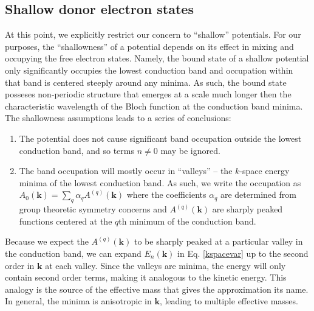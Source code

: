 \subsection{Shallow donor electron states}
At this point, we explicitly restrict our concern to ``shallow''
potentials. For our purposes, the ``shallowness'' of a potential
depends on its effect in mixing and occupying the free electron
states. Namely, the bound state of a shallow potential only significantly
occupies the lowest conduction band and occupation within that band is
centered steeply around any minima. As such, the bound state posseses
non-periodic structure that emerges at a scale much longer then the
characteristic wavelength of the Bloch function at the conduction band
minima. The shallowness assumptions leads to a series of conclusions:
\begin{enumerate}
\item The potential does not cause significant band occupation outside
  the lowest conduction band, and so terms $n \ne 0$ may be ignored.
\item The band occupation will mostly occur in ``valleys'' -- the
  $k$-space energy minima of the lowest conduction band. As such, we
  write the occupation as $A_0(\bm{k}) = \sum_{q} \alpha_{q}
  A^{(q)}(\bm{k})$ where the coefficients $\alpha_{q}$ are determined
  from group theoretic symmetry concerns and $A^{(q)}(\bm{k})$ are
  sharply peaked functions centered at the $q$th minimum of the
  conduction band.
\end{enumerate}

Because we expect the $A^{(q)}(\bm{k})$ to be sharply peaked at a
particular valley in the conduction band, we can expand $E_n(\bm{k})$
in Eq. \eqref{kspacevar} up to the second order in $\bm{k}$ at each
valley. Since the valleys are minima, the energy will only contain
second order terms, making it analogous to the kinetic energy. This
analogy is the source of the effective mass that gives the
approximation its name. In general, the minima is anisotropic in
$\bm{k}$, leading to multiple effective masses.

